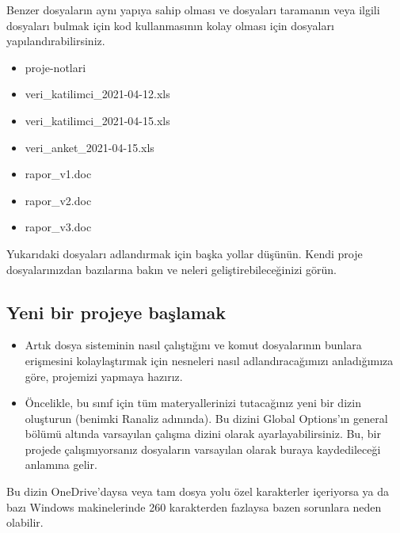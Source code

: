 \documentclass[
  oneside]{book}
\providecommand{\tightlist}{%
  \setlength{\itemsep}{0pt}\setlength{\parskip}{0pt}}
\begin{document}
Benzer dosyaların aynı yapıya sahip olması ve dosyaları taramanın veya ilgili dosyaları bulmak için kod kullanmasının kolay olması için dosyaları yapılandırabilirsiniz.

\begin{itemize}
\tightlist
\item
  proje-notlari
\item
  veri\_katilimci\_2021-04-12.xls
\item
  veri\_katilimci\_2021-04-15.xls
\item
  veri\_anket\_2021-04-15.xls
\item
  rapor\_v1.doc
\item
  rapor\_v2.doc
\item
  rapor\_v3.doc
\end{itemize}

\begin{try}
Yukarıdaki dosyaları adlandırmak için başka yollar düşünün. Kendi proje dosyalarınızdan bazılarına bakın ve neleri geliştirebileceğinizi görün.

\end{try}

\hypertarget{yeni-bir-projeye-baux15flamak}{%
\subsection{Yeni bir projeye başlamak}\label{yeni-bir-projeye-baux15flamak}}

\begin{itemize}
\item
  Artık dosya sisteminin nasıl çalıştığını ve komut dosyalarının bunlara erişmesini kolaylaştırmak için nesneleri nasıl adlandıracağımızı anladığımıza göre, projemizi yapmaya hazırız.
\item
  Öncelikle, bu sınıf için tüm materyallerinizi tutacağınız yeni bir dizin oluşturun (benimki Ranaliz adınında). Bu dizini Global Options'ın general bölümü altında varsayılan çalışma dizini olarak ayarlayabilirsiniz. Bu, bir projede çalışmıyorsanız dosyaların varsayılan olarak buraya kaydedileceği anlamına gelir.
\end{itemize}

\begin{warning}
Bu dizin OneDrive'daysa veya tam dosya yolu özel karakterler içeriyorsa ya da bazı Windows makinelerinde 260 karakterden fazlaysa bazen sorunlara neden olabilir.

\end{warning}
\end{document}
